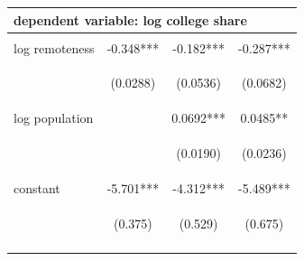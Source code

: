 \documentclass[12 pt]{article}
\renewcommand{\arraystretch}{.5}
\begin{document}
\begin{table}[H]
    \centering
    \setlength{\tabcolsep}{14pt} %
    \renewcommand{\arraystretch}{.8} %
    \begin{tabular}{lccc} \midrule
    \multicolumn{4}{l}{dependent variable: log college share } \\ \midrule
	& \begin{footnotesize}\end{footnotesize} & \begin{footnotesize}\end{footnotesize} & \begin{footnotesize}\end{footnotesize} \\
    log remoteness & -0.348*** & -0.182*** & -0.287*** \\
    \vspace{4pt} & \begin{footnotesize}(0.0288)\end{footnotesize} & \begin{footnotesize}(0.0536)\end{footnotesize} & \begin{footnotesize}(0.0682)\end{footnotesize} \\
    log population &  & 0.0692*** & 0.0485** \\
    \vspace{4pt} & \begin{footnotesize}\end{footnotesize} & \begin{footnotesize}(0.0190)\end{footnotesize} & \begin{footnotesize}(0.0236)\end{footnotesize} \\
    constant & -5.701*** & -4.312*** & -5.489*** \\
     & \begin{footnotesize}(0.375)\end{footnotesize} & \begin{footnotesize}(0.529)\end{footnotesize} & \begin{footnotesize}(0.675)\end{footnotesize} \\
    \vspace{4pt} & \begin{footnotesize}\end{footnotesize} & \begin{footnotesize}\end{footnotesize} & \begin{footnotesize}\end{footnotesize} \\

\end{tabular}
\end{table}
\end{document}
